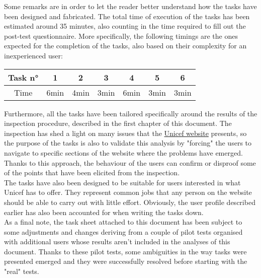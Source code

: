 
	
Some remarks are in order to let the reader better understand how the tasks have been designed and fabricated. 
The total time of execution of the tasks has been estimated around 35 minutes, also counting in the time required to fill out the post-test questionnaire. More specifically, the following timings are the ones expected for the completion of the tasks, also based on their complexity for an inexperienced user:

\vspace{0.5cm}

{
	\renewcommand{\arraystretch}{1.45}
	\setlength{\tabcolsep}{0.5cm}
	\centering 
\begin{tabular}{c| c c c c c c}
	Task n° &1 & 2 & 3 & 4 & 5 & 6\\
	\hline
	Time & 6min & 4min & 3min & 6min & 3min & 3min
	
\end{tabular}

}

\vspace{0.5cm}

Furthermore, all the tasks have been tailored specifically around the results of the inspection procedure, described in the first chapter of this document. The inspection has shed a light on many issues that the \href{https://www.unicef.org/}{Unicef website} presents, so the purpose of the tasks is also to validate this analysis by "forcing" the users to navigate to specific sections of the website where the problems have emerged. Thanks to this approach, the behaviour of the users can confirm or disproof some of the points that have been elicited from the inspection.\\
The tasks have also been designed to be suitable for users interested in what Unicef has to offer. They represent common jobs that any person on the website should be able to carry out with little effort. Obviously, the user profile described earlier has also been accounted for when writing the tasks down.\\
As a final note, the task sheet attached to this document has been subject to some adjustments and changes deriving from a couple of pilot tests organised with additional users whose results aren't included in the analyses of this document. Thanks to these pilot tests, some ambiguities in the way tasks were presented emerged and they were successfully resolved before starting with the "real" tests.\\

